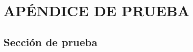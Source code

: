 \chapter[Apéndice de prueba]{APÉNDICE DE PRUEBA}
\startcontents
\printchaptertableofcontents

\lipsum[1-3]
\section{Sección de prueba}
\lipsum[1-5]